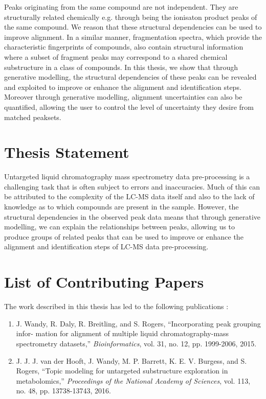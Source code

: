 Peaks originating from the same compound are not independent. They are structurally related chemically e.g. through being the ionisaton product peaks of the same compound. We reason that these structural dependencies can be used to improve alignment. In a similar manner, fragmentation spectra, which provide the characteristic fingerprints of compounds, also contain structural information where a subset of fragment peaks may correspond to a shared chemical substructure in a class of compounds. In this thesis, we show that through generative modelling, the structural dependencies of these peaks can be revealed and exploited to improve or enhance the alignment and identification steps. Moreover through generative modelling, alignment uncertainties can also be quantified, allowing the user to control the level of uncertainty they desire from matched peaksets.

\section{Thesis Statement\label{sub:thesis-statement}}

Untargeted liquid chromatography mass spectrometry data pre-processing is a challenging task that is often subject to errors and inaccuracies. Much of this can be attributed to the complexity of the LC-MS data itself and also to the lack of knowledge as to which compounds are present in the sample. However, the structural dependencies in the observed peak data means that through generative modelling, we can explain the relationships between peaks, allowing us to produce groups of related peaks that can be used to improve or enhance the alignment and identification steps of LC-MS data pre-processing.

\section{List of Contributing Papers}

The work described in this thesis has led to the following publications \cite{wandy2015incorporating, vanderHooft29112016}:

\begin{enumerate}
\item J. Wandy, R. Daly, R. Breitling, and S. Rogers, ``Incorporating peak grouping infor- mation for alignment of multiple liquid chromatography-mass spectrometry datasets,'' \textit{Bioinformatics}, vol. 31, no. 12, pp. 1999-2006, 2015.
\item J. J. J. van der Hooft, J. Wandy, M. P. Barrett, K. E. V. Burgess, and S. Rogers, ``Topic modeling for untargeted substructure exploration in metabolomics,'' \textit{Proceedings of the National Academy of Sciences}, vol. 113, no. 48, pp. 13738-13743, 2016.
\end{enumerate}

